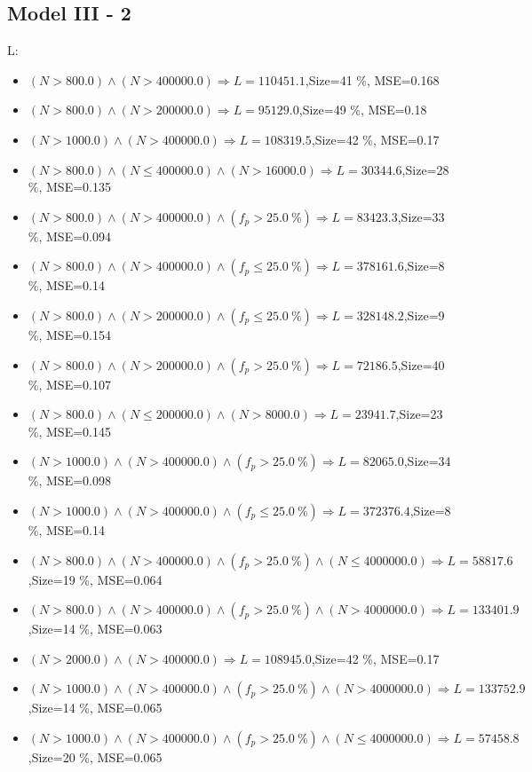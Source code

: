 \documentclass[numbered]{CSL}
\begin{document}
\subsection{Model III - 2}
L:
\begin{itemize}
\item $(N > 800.0) \land (N > 400000.0) \Rightarrow L = 110451.1$,\hfill Size=41 \%, MSE=0.168
\item $(N > 800.0) \land (N > 200000.0) \Rightarrow L = 95129.0$,\hfill Size=49 \%, MSE=0.18
\item $(N > 1000.0) \land (N > 400000.0) \Rightarrow L = 108319.5$,\hfill Size=42 \%, MSE=0.17
\item $(N > 800.0) \land (N \leq 400000.0) \land (N > 16000.0) \Rightarrow L = 30344.6$,\hfill Size=28 \%, MSE=0.135
\item $(N > 800.0) \land (N > 400000.0) \land (f_p > 25.0~\%) \Rightarrow L = 83423.3$,\hfill Size=33 \%, MSE=0.094
\item $(N > 800.0) \land (N > 400000.0) \land (f_p \leq 25.0~\%) \Rightarrow L = 378161.6$,\hfill Size=8 \%, MSE=0.14
\item $(N > 800.0) \land (N > 200000.0) \land (f_p \leq 25.0~\%) \Rightarrow L = 328148.2$,\hfill Size=9 \%, MSE=0.154
\item $(N > 800.0) \land (N > 200000.0) \land (f_p > 25.0~\%) \Rightarrow L = 72186.5$,\hfill Size=40 \%, MSE=0.107
\item $(N > 800.0) \land (N \leq 200000.0) \land (N > 8000.0) \Rightarrow L = 23941.7$,\hfill Size=23 \%, MSE=0.145
\item $(N > 1000.0) \land (N > 400000.0) \land (f_p > 25.0~\%) \Rightarrow L = 82065.0$,\hfill Size=34 \%, MSE=0.098
\item $(N > 1000.0) \land (N > 400000.0) \land (f_p \leq 25.0~\%) \Rightarrow L = 372376.4$,\hfill Size=8 \%, MSE=0.14
\item $(N > 800.0) \land (N > 400000.0) \land (f_p > 25.0~\%) \land (N \leq 4000000.0) \Rightarrow L = 58817.6$,\hfill Size=19 \%, MSE=0.064
\item $(N > 800.0) \land (N > 400000.0) \land (f_p > 25.0~\%) \land (N > 4000000.0) \Rightarrow L = 133401.9$,\hfill Size=14 \%, MSE=0.063
\item $(N > 2000.0) \land (N > 400000.0) \Rightarrow L = 108945.0$,\hfill Size=42 \%, MSE=0.17
\item $(N > 1000.0) \land (N > 400000.0) \land (f_p > 25.0~\%) \land (N > 4000000.0) \Rightarrow L = 133752.9$,\hfill Size=14 \%, MSE=0.065
\item $(N > 1000.0) \land (N > 400000.0) \land (f_p > 25.0~\%) \land (N \leq 4000000.0) \Rightarrow L = 57458.8$,\hfill Size=20 \%, MSE=0.065

\end{itemize}
\end{document}
